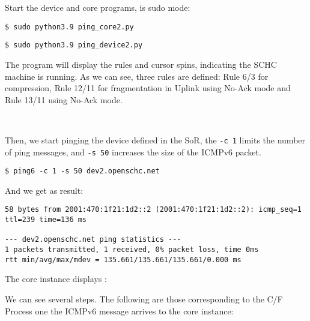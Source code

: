 Start the device and core programs, is sudo mode:

\begin{lstlisting}
$ sudo python3.9 ping_core2.py 
\end{lstlisting}

\begin{lstlisting}
$ sudo python3.9 ping_device2.py 
\end{lstlisting}

The program will display the rules and cursor spins, indicating the SCHC machine is running.
As we can see, three rules are defined: Rule 6/3 for compression, Rule 12/11 for fragmentation in Uplink using No-Ack mode and Rule 13/11 using No-Ack mode.

~



Then, we start pinging the device defined in the SoR, the \texttt{-c 1} limits the number of ping messages, and \texttt{-s 50} increases the size of the ICMPv6 packet.

\begin{lstlisting}
$ ping6 -c 1 -s 50 dev2.openschc.net
\end{lstlisting}

And we get as result:

\begin{lstlisting}[basicstyle=\ttfamily\scriptsize]
58 bytes from 2001:470:1f21:1d2::2 (2001:470:1f21:1d2::2): icmp_seq=1 ttl=239 time=136 ms

--- dev2.openschc.net ping statistics ---
1 packets transmitted, 1 received, 0% packet loss, time 0ms
rtt min/avg/max/mdev = 135.661/135.661/135.661/0.000 ms

\end{lstlisting}

The core instance displays :



We can see several steps. 
The following are those corresponding to the C/F Process one the ICMPv6 message arrives to the core instance:

~

